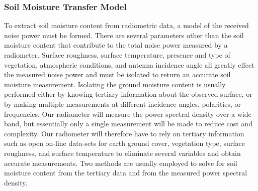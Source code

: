 \documentclass[12pt]{article}
\begin{document}
\subsubsection{Soil Moisture Transfer Model}

To extract soil moisture content from radiometric data, a model of the received noise power must be formed. There are several parameters other than the soil moisture content that contribute to the total noise power measured by a radiometer. Surface roughness, surface temperature, presence and type of vegetation, atmospheric conditions, and antenna incidence angle all greatly effect the measured noise power and must be isolated to return an accurate soil moisture measurement. Isolating the ground moisture content is usually performed either by knowing tertiary information about the observed surface, or by making multiple measurements at different incidence angles, polarities, or frequencies. Our radiometer will measure the power spectral density over a wide band, but essentially only a single measurement will be made to reduce cost and complexity. Our radiometer will therefore have to rely on tertiary information such as open on-line data-sets for earth ground cover, vegetation type, surface roughness, and surface temperature to eliminate several variables and obtain accurate measurements. Two methods are usually employed to solve for soil moisture content from the tertiary data and from the measured power spectral density.
\end{document}

